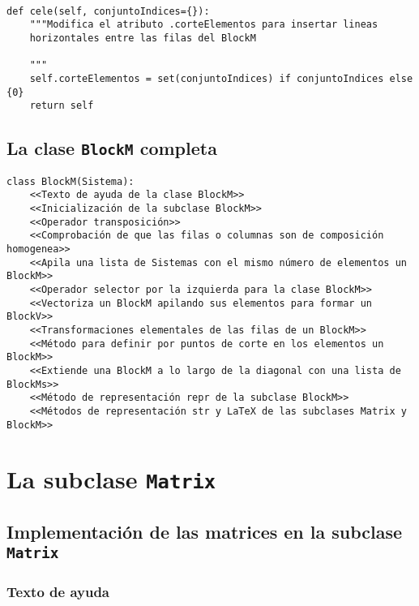 \documentclass[11pt]{report}
\begin{document}
\begin{verbatim}

def cele(self, conjuntoIndices={}):
    """Modifica el atributo .corteElementos para insertar lineas
    horizontales entre las filas del BlockM

    """
    self.corteElementos = set(conjuntoIndices) if conjuntoIndices else {0}
    return self

\end{verbatim}


\clearpage

\section{La clase \texttt{BlockM} completa}
\label{sec:org1903fc8}

\begin{verbatim}
class BlockM(Sistema):
    <<Texto de ayuda de la clase BlockM>>
    <<Inicialización de la subclase BlockM>>
    <<Operador transposición>>
    <<Comprobación de que las filas o columnas son de composición homogenea>>
    <<Apila una lista de Sistemas con el mismo número de elementos un BlockM>>
    <<Operador selector por la izquierda para la clase BlockM>>
    <<Vectoriza un BlockM apilando sus elementos para formar un BlockV>>
    <<Transformaciones elementales de las filas de un BlockM>>
    <<Método para definir por puntos de corte en los elementos un BlockM>>
    <<Extiende una BlockM a lo largo de la diagonal con una lista de BlockMs>>
    <<Método de representación repr de la subclase BlockM>>
    <<Métodos de representación str y LaTeX de las subclases Matrix y BlockM>>
\end{verbatim}


\chapter{La subclase \texttt{Matrix}}
\label{sec:org0b899d4}

\section{Implementación de las matrices en la subclase \texttt{Matrix}}
\label{sec:org65ddf83}

\subsection{Texto de ayuda}
\label{sec:orgf33f254}
\end{document}
